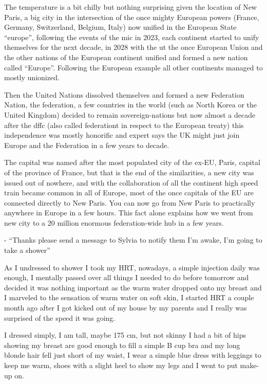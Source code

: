 \documentclass[hidelinks,12pt,a4paper]{book}
\begin{document}
The temperature is a bit chilly but nothing surprising given the location of New Paris,
a big city in the intersection of the once mighty European powers (France, Germany, Switzerland, Belgium, Italy) 
now unified in the European State “\gls{europe}”, following the events of the \gls{mic} in 2023, 
each continent started to unify themselves for the next decade, in 2028 with the \gls{ut} the once European Union 
and the other nations of the European continent unified and formed a new nation called “Europe”. 
Following the European example all other continents managed to mostly unionized.\par
\bigskip 

Then the United Nations dissolved themselves and formed a new Federation Nation, 
the \gls{federation}, a few countries in the world (such as North Korea or the United Kingdom) 
decided to remain sovereign-nations but now almost a decade after the \gls{dffc} (also called \gls{federationt} in respect to the European treaty) this independence was mostly honorific 
and expert says the UK might just join Europe and the Federation in a few years to decade.\par
\bigskip

The capital was named after the most populated city of the ex-EU, 
Paris, capital of the province of France, but that is the end of the similarities, 
a new city was issued out of nowhere, and with the collaboration of all the continent 
high speed train became common in all of Europe, most of the once capitals of the EU are connected directly to New Paris. 
You can now go from New Paris to practically anywhere in Europe in a few hours. 
This fact alone explains how we went from new city to a 20 million enormous federation-wide hub in a few years.\par
\bigskip

- “Thanks please send a message to Sylvia to notify them I'm awake, I'm going to take a shower”\par
\bigskip
As I undressed to shower I took my HRT, nowadays, a simple injection daily was enough, 
I mentally passed over all things I needed to do before tomorrow and decided it was nothing 
important as the warm water dropped onto my breast and I marveled to the sensation of warm water on soft skin, 
I started HRT a couple month ago after I got kicked out of my house by my parents and 
I really was surprised of the speed it was going.\par
\bigskip

I dressed simply, I am tall, maybe 175 cm, 
but not skinny I had a bit of hips showing my breast are good enough to fill a simple B cup bra and 
my long blonde hair fell just short of my waist, I wear a simple blue dress with leggings to keep me warm, 
shoes with a slight heel to show my legs and I went to put make-up on.\par
\bigskip
\end{document}
